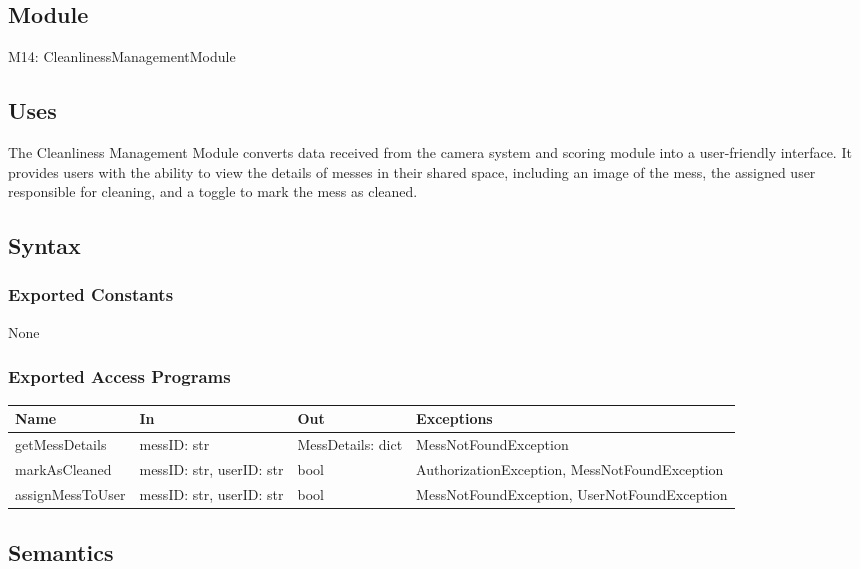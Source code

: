 \documentclass[12pt, titlepage]{article}
\begin{document}
\subsection{Module}

M14: CleanlinessManagementModule

\subsection{Uses}

The Cleanliness Management Module converts data received from the camera system and scoring module into a user-friendly interface. It provides users with the ability to view the details of messes in their shared space, including an image of the mess, the assigned user responsible for cleaning, and a toggle to mark the mess as cleaned.

\subsection{Syntax}

\subsubsection{Exported Constants}
None

\subsubsection{Exported Access Programs}

\begin{center}
\begin{tabular}{p{3cm} p{5cm} p{3cm} p{5cm}}
\hline
\textbf{Name} & \textbf{In} & \textbf{Out} & \textbf{Exceptions} \\
\hline
getMessDetails & messID: str & MessDetails: dict & MessNotFoundException \\

markAsCleaned & messID: str, userID: str & bool & AuthorizationException, MessNotFoundException \\

assignMessToUser & messID: str, userID: str & bool & MessNotFoundException, UserNotFoundException \\
\hline
\end{tabular}
\end{center}

\subsection{Semantics}
\end{document}
